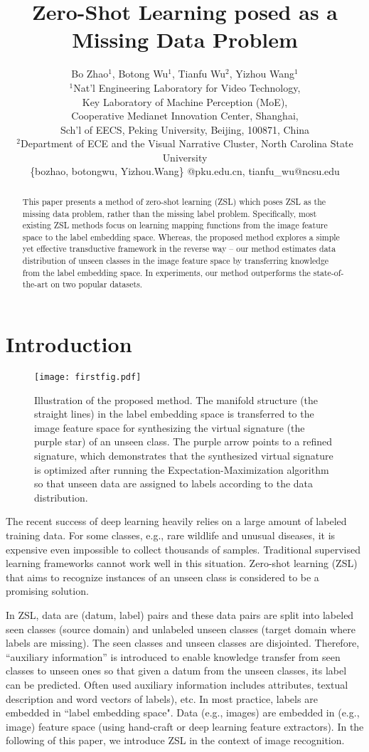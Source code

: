 \documentclass{article}
\title{Zero-Shot Learning posed as a Missing Data Problem}
\author{Bo Zhao$^{1}$, Botong Wu$^{1}$, Tianfu Wu$^{2}$, Yizhou Wang$^{1}$\\
\normalsize $^1$Nat'l Engineering Laboratory for Video Technology,\\
\normalsize Key Laboratory of Machine Perception (MoE),\\
\normalsize    Cooperative Medianet Innovation Center, Shanghai,\\
\normalsize	 Sch'l of EECS, Peking University, Beijing, 100871, China\\
\normalsize	$^2$Department of ECE and the Visual Narrative Cluster, North Carolina State University \\
{\small  \{bozhao, botongwu, Yizhou.Wang\} @pku.edu.cn, tianfu\_wu@ncsu.edu}
}
\begin{document}
\maketitle

\begin{abstract}
This paper presents a method of zero-shot learning (ZSL) which poses ZSL as the missing data problem, rather than the missing label problem.  Specifically, most existing ZSL methods focus on learning mapping functions from the image feature space to the label embedding space. Whereas, the proposed method explores a simple yet effective transductive framework in the reverse way \--- our method estimates data distribution of unseen classes in the image feature space  by transferring knowledge from the label embedding space. In experiments, our method outperforms the state-of-the-art on two popular datasets.
\end{abstract}

\section{Introduction}

\begin{figure}[h] %
  \centering
  \texttt{[image: firstfig.pdf]}
  \caption{Illustration of the proposed method. The manifold structure (the straight lines) in the label embedding space is transferred to the image feature space for synthesizing the virtual signature (the purple star) of an unseen class. The purple arrow points to a refined signature, which demonstrates that the synthesized virtual signature is optimized after running the Expectation-Maximization algorithm so that unseen data are assigned to labels according to the data distribution.}
  \label{fig:firstfig}
\end{figure}


The recent success of deep learning heavily relies on a large amount of labeled training data. For some classes, e.g., rare wildlife and unusual diseases, it is expensive even impossible to collect thousands of samples. Traditional supervised learning frameworks cannot work well in this situation. Zero-shot learning (ZSL) that aims to recognize instances of an unseen class is considered to be a promising solution.

In ZSL, data are (datum, label) pairs and these data pairs are split into labeled seen classes (source domain) and unlabeled unseen classes (target domain where labels are missing). The seen classes and unseen classes are disjointed. Therefore, ``auxiliary information'' is introduced to enable knowledge transfer from seen classes to unseen ones so that given a datum from the unseen classes, its label can be predicted. Often used auxiliary information includes attributes\cite{lampert2014attribute}, textual description\cite{lei2015predicting} and word vectors of labels\cite{socher2013zero}), etc. In most practice, labels are embedded in ``label embedding space". Data (e.g., images) are embedded in (e.g., image) feature space (using hand-craft or deep learning feature extractors). In the following of this paper, we introduce ZSL in the context of image recognition.
\end{document}
